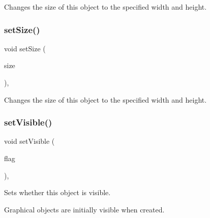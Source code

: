 Changes the size of this object to the specified width and height. 

\mbox{\label{classsgl_1_1GObject_ae2b628228f192c2702c4ce941b2af68f}} 
\subsubsection{\texorpdfstring{set\+Size()}{setSize()}\hspace{0.1cm}{\footnotesize\ttfamily [2/2]}}
{\footnotesize\ttfamily void set\+Size (\begin{DoxyParamCaption}\item[{const \mbox{\hyperlink{structsgl_1_1GDimension}{G\+Dimension}} \&}]{size }\end{DoxyParamCaption})\hspace{0.3cm}{\ttfamily [virtual]}, {\ttfamily [inherited]}}



Changes the size of this object to the specified width and height. 

\mbox{\label{classsgl_1_1GObject_a88203f28224315d9f4471212f4af8ed3}} 
\subsubsection{\texorpdfstring{set\+Visible()}{setVisible()}}
{\footnotesize\ttfamily void set\+Visible (\begin{DoxyParamCaption}\item[{bool}]{flag }\end{DoxyParamCaption})\hspace{0.3cm}{\ttfamily [virtual]}, {\ttfamily [inherited]}}



Sets whether this object is visible. 

Graphical objects are initially visible when created. \mbox{\label{classsgl_1_1GObject_aa3f3fba4cb131baa8696ba01e3bceca1}} 

